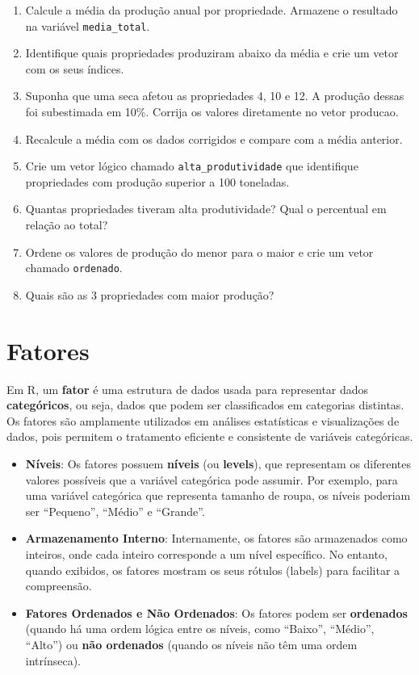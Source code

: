 \documentclass[
]{book}
\providecommand{\tightlist}{%
  \setlength{\itemsep}{0pt}\setlength{\parskip}{0pt}}
\begin{document}
\begin{enumerate}
\def\labelenumi{(\alph{enumi})}
\setcounter{enumi}{1}
\item
  Calcule a média da produção anual por propriedade. Armazene o resultado na variável \texttt{media\_total}.
\item
  Identifique quais propriedades produziram abaixo da média e crie um vetor com os seus índices.
\item
  Suponha que uma seca afetou as propriedades 4, 10 e 12. A produção dessas foi subestimada em 10\%. Corrija os valores diretamente no vetor producao.
\item
  Recalcule a média com os dados corrigidos e compare com a média anterior.
\item
  Crie um vetor lógico chamado \texttt{alta\_produtividade} que identifique propriedades com produção superior a 100 toneladas.
\item
  Quantas propriedades tiveram alta produtividade? Qual o percentual em relação ao total?
\item
  Ordene os valores de produção do menor para o maior e crie um vetor chamado \texttt{ordenado}.
\item
  Quais são as 3 propriedades com maior produção?
\end{enumerate}

\section{Fatores}\label{fatores}

Em R, um \textbf{fator} é uma estrutura de dados usada para representar dados
\textbf{categóricos}, ou seja, dados que podem ser classificados em
categorias distintas. Os fatores são amplamente utilizados em análises
estatísticas e visualizações de dados, pois permitem o tratamento
eficiente e consistente de variáveis categóricas.

\begin{itemize}
\tightlist
\item
  \textbf{Níveis}: Os fatores possuem \textbf{níveis} (ou \textbf{levels}), que
  representam os diferentes valores possíveis que a variável
  categórica pode assumir. Por exemplo, para uma variável categórica
  que representa tamanho de roupa, os níveis poderiam ser ``Pequeno'',
  ``Médio'' e ``Grande''.
\item
  \textbf{Armazenamento Interno}: Internamente, os fatores são armazenados
  como inteiros, onde cada inteiro corresponde a um nível específico.
  No entanto, quando exibidos, os fatores mostram os seus rótulos
  (labels) para facilitar a compreensão.
\item
  \textbf{Fatores Ordenados e Não Ordenados}: Os fatores podem ser
  \textbf{ordenados} (quando há uma ordem lógica entre os níveis, como
  ``Baixo'', ``Médio'', ``Alto'') ou \textbf{não ordenados} (quando os níveis não
  têm uma ordem intrínseca).
\end{itemize}
\end{document}

